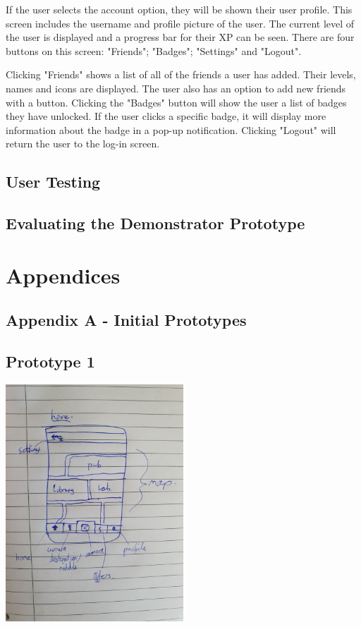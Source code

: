 \documentclass[10pt,twocolumn]{article} %
\begin{document}
If the user selects the account option, they will be shown their user profile. This screen includes the username and profile picture of the user. The current level of the user is displayed and a progress bar for their XP can be seen. There are four buttons on this screen: "Friends"; "Badges"; "Settings" and "Logout".

Clicking "Friends" shows a list of all of the friends a user has added. Their levels, names and icons are displayed. The user also has an option to add new friends with a button. Clicking the "Badges" button will show the user a list of badges they have unlocked. If the user clicks a specific badge, it will display more information about the badge in a pop-up notification. Clicking "Logout" will return the user to the log-in screen.

\subsection*{User Testing}

\subsection*{Evaluating the Demonstrator Prototype}

\onecolumn
\section*{Appendices}
\subsection*{Appendix A - Initial Prototypes}
\subsection*{Prototype 1}
\includegraphics[width=0.5\textwidth]{./figures/bens_initial_proto/1.jpg}
\end{document}
